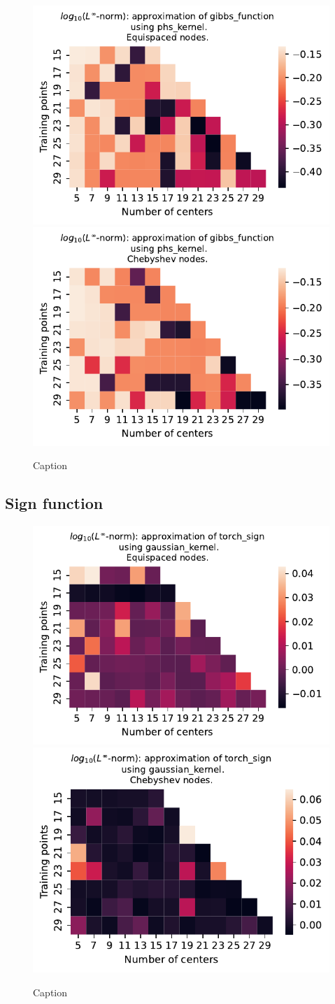 \documentclass[12pt]{report} %
\begin{document}
\begin{figure}[ht]
  \centering

  \includegraphics[width=.49\textwidth]{imagenes/experiments/1d/variational/gibbs_function-Kphs_kernel-Equi.pdf}
  \includegraphics[width=.49\textwidth]{imagenes/experiments/1d/variational/gibbs_function-Kphs_kernel-Cheb.pdf}
  \caption{Caption}
  \label{fig:gibbs-phs}
\end{figure}


\subsection*{Sign function}

\begin{figure}[ht]
  \centering

  \includegraphics[width=.49\textwidth]{imagenes/experiments/1d/variational/torch_sign-Kgaussian_kernel-Equi.pdf}
  \includegraphics[width=.49\textwidth]{imagenes/experiments/1d/variational/torch_sign-Kgaussian_kernel-Cheb.pdf}
  \caption{Caption}
  \label{fig:torch-sign-gaussian}
\end{figure}
\end{document}
